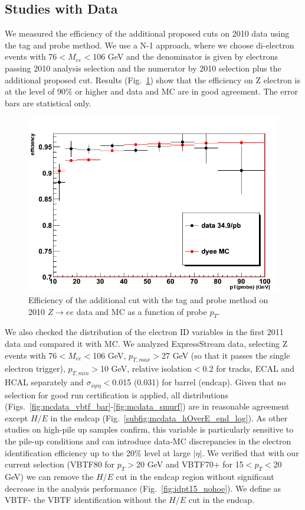 \subsection{Studies with Data}

We measured the efficiency of the additional proposed cuts on 2010 data using the tag and probe method.
We use a N-1 approach, where we choose di-electron events with 76$<M_{ee}<$106 GeV and the denominator is given by electrons passing 2010 analysis selection
and the numerator by 2010 selection plus the additional proposed cut. 
Results (Fig.~\ref{fig:eID-tnp}) show that the efficiency on Z electron is at the level of 90\%
or higher and data and MC are in good agreement. The error bars are statistical only.

\begin{figure}[!hbtp]
\centering
\includegraphics[width=.45\textwidth]{figures/eID-tnp.png}
\caption{Efficiency of the additional cut with the tag and probe method on 2010 $Z\rightarrow ee$ data and MC as a function of probe $p_T$.}
\label{fig:eID-tnp}
\end{figure}

We also checked the distribution of the electron ID variables in the first 2011 data and compared it with MC.
We analyzed ExpressStream data, selecting Z events with 76$<M_{ee}<$106 GeV, $p_{T,max}>$27 GeV (so that it passes the single electron trigger), 
$p_{T,min}>$10 GeV, relative isolation$<$0.2 for tracks, ECAL and HCAL separately and $\sigma_{i\eta i\eta}<$0.015 (0.031) for barrel (endcap).
Given that no selection for good run certification is applied, all distributions (Figs.~\ref{fig:mcdata_vbtf_bar}-\ref{fig:mcdata_smurf}) 
are in reasonable agreement except $H/E$ in the endcap (Fig.~\ref{subfig:mcdata_hOverE_end_log}). 
As other studies on high-pile up samples confirm, this variable is particularly sensitive to the pile-up conditions and can introduce data-MC discrepancies 
in the electron identification efficiency up to the 20\% level at large $|\eta|$.
We verified that with our current selection (VBTF80 for $p_T>$20 GeV and VBTF70+ for 15$<p_T<$20 GeV) we can remove the $H/E$ cut in the endcap
region without significant decrease in the analysis performance (Fig.~\ref{fig:idpt15_nohoe}). We define as VBTF- the VBTF identification without the $H/E$ cut in the endcap.

